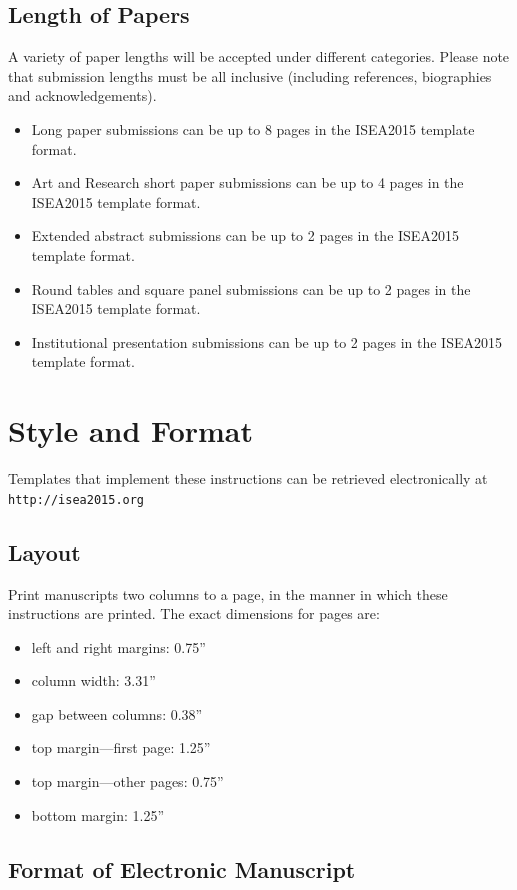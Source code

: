 \documentclass[letterpaper]{article}
\begin{document}
\subsection{Length of Papers}
A variety of paper lengths will be accepted under different categories. Please note that submission lengths must be all inclusive (including references, biographies and acknowledgements).
\begin{itemize}
\item Long paper submissions can be up to 8 pages in the ISEA2015 template format.
\item Art and Research short paper submissions can be up to 4 pages in the ISEA2015 template format.
\item Extended abstract submissions can be up to 2 pages in the ISEA2015 template format.
\item Round tables and square panel submissions can be up to 2 pages in the ISEA2015 template format.
\item Institutional presentation submissions can be up to 2 pages in the ISEA2015 template format.
\end{itemize}

\section{Style and Format}
Templates that implement these instructions can be retrieved electronically at {\small \tt http://isea2015.org}

\subsection{Layout}

Print manuscripts two columns to a page, in the manner in which these instructions are printed. The exact dimensions for pages are:
\begin{itemize}
\item left and right margins: 0.75''
\item column width: 3.31''
\item gap between columns: 0.38''
\item top margin—first page: 1.25''
\item top margin—other pages: 0.75''
\item bottom margin: 1.25''
\end{itemize}

\subsection{Format of Electronic Manuscript}
\end{document}
